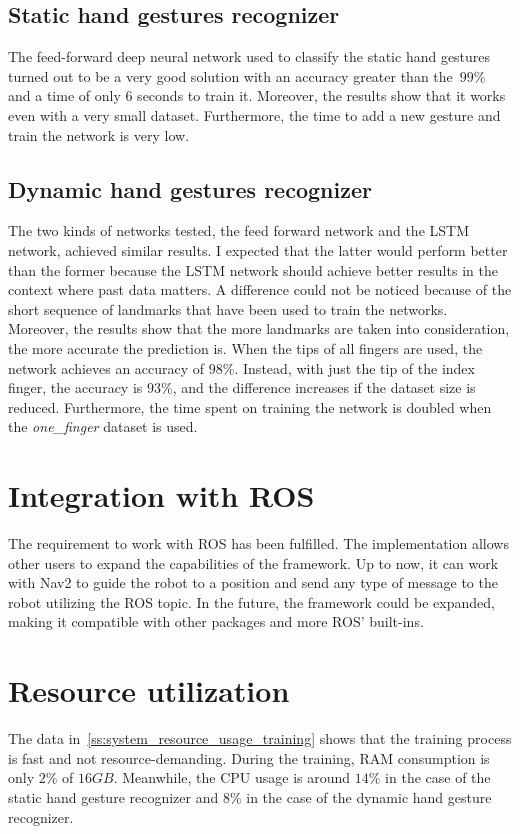 \documentclass[../thesis.tex]{subfiles}
\begin{document}
\subsection{Static hand gestures recognizer}
The feed-forward deep neural network used to classify the static hand gestures turned out to be a very good solution with an accuracy greater than the $99\%$ and a time of only $6$ seconds to train it. Moreover, the results show that it works even with a very small dataset. Furthermore, the time to add a new gesture and train the network is very low.

\subsection{Dynamic hand gestures recognizer}
The two kinds of networks tested, the feed forward network and the \acrshort{LSTM} network, achieved similar results. I expected that the latter would perform better than the former because the \acrshort{LSTM} network should achieve better results in the context where past data matters. A difference could not be noticed because of the short sequence of landmarks that have been used to train the networks.\\

Moreover, the results show that the more landmarks are taken into consideration, the more accurate the prediction is. When the tips of all fingers are used, the network achieves an accuracy of $98\%$. Instead, with just the tip of the index finger, the accuracy is $93\%$, and the difference increases if the dataset size is reduced. Furthermore, the time spent on training the network is doubled when the \textit{one\_finger} dataset is used.

\section{Integration with ROS}
The requirement to work with \acrshort{ROS} has been fulfilled. The implementation allows other users to expand the capabilities of the framework. Up to now, it can work with Nav2 to guide the robot to a position and send any type of message to the robot utilizing the \acrshort{ROS} topic. In the future, the framework could be expanded, making it compatible with other packages and more \acrshort{ROS}' built-ins.

\section{Resource utilization}
The data in~\ref{ss:system_resource_usage_training} shows that the training process is fast and not resource-demanding. During the training, RAM consumption is only $2\%$ of $16GB$. Meanwhile, the CPU usage is around $14\%$ in the case of the static hand gesture recognizer and $8\%$ in the case of the dynamic hand gesture recognizer.\\
\end{document}
